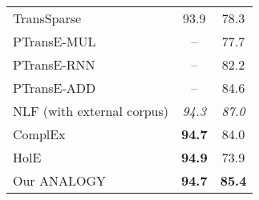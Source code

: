 \documentclass{article}
\begin{document}
\begin{table}[t]
\begin{tabular}{@{}l|cc@{}}
        TransSparse \cite{DBLP:conf/aaai/JiLH016}              & 93.9          & 78.3        \\
        PTransE-MUL \cite{lin2015modeling}	& --            & 77.7        \\
        PTransE-RNN \cite{lin2015modeling}  & --            & 82.2        \\
        PTransE-ADD \cite{lin2015modeling}  & --            & 84.6        \\
        \pbox{4cm}{NLF (with external corpus) \\ \cite{toutanova2015observed}}         & \textit{94.3} & \textit{87.0} \\
ComplEx \cite{DBLP:conf/icml/TrouillonWRGB16}              & \textbf{94.7}          & 84.0        \\
        HolE   \cite{DBLP:conf/aaai/NickelRP16}               & \textbf{94.9}          & 73.9        \\
        \midrule
        Our ANALOGY               &     \textbf{94.7}      & \textbf{85.4}   \\ 
\bottomrule
    \end{tabular}
    \label{tab:results-main}
\end{table}
\end{document}

